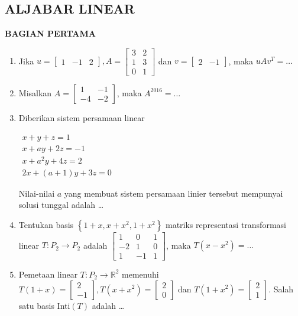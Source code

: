 \documentclass[12pt,twoside]{article}
\begin{document}
\subsection{ALJABAR LINEAR}
\textbf{BAGIAN PERTAMA}
\begin{enumerate}
	\item Jika $u = \left[ \begin{array}{ccc}
				      1 & -1 & 2
			      \end{array} \right], A = \left[ \begin{array}{cc}
				      3 & 2 \\1&3\\0&1
			      \end{array} \right]$ dan $v = \left[ \begin{array}{cc}
				      2 & -1
			      \end{array} \right]$, maka $uAv^T = \dots$

	\item Misalkan $A = \left[ \begin{array}{cc}
				      1 & -1 \\-4&-2
			      \end{array} \right]$, maka $A^{2016} = \dots$

	\item Diberikan sistem persamaan linear
	      \begin{center}
		      $\begin{array}{r}
				      x+y+z = 1   \\
				      x+ay+2z=-1  \\
				      x+a^2y+4z=2 \\
				      2x+(a+1)y+3z = 0
			      \end{array}$
	      \end{center}
	      Nilai-nilai $a$ yang membuat sistem persamaan linier tersebut mempunyai solusi tunggal adalah \dots

	\item Tentukan basis $\left\lbrace 1+x, x+x^2 , 1+x^2 \right\rbrace$ matriks representasi transformasi linear $T : P_2 \to P_2 $ adalah $\left[ \begin{array}{ccc}
				      1 & 0 & 1 \\-2&1&0\\1&-1&1
			      \end{array} \right]$, maka $T(x-x^2) =\dots$

	\item Pemetaan linear $T : P_2 \to \mathbb{R}^2$ memenuhi $T(1+x) = \left[ \begin{array}{c}
				      2 \\-1
			      \end{array} \right], T(x+x^2) = \left[ \begin{array}{c}
				      2 \\0
			      \end{array} \right]$ dan $T(1+x^2) = \left[ \begin{array}{c}
				      2 \\1
			      \end{array} \right]$. Salah satu basis Inti$(T)$ adalah \dots


\end{enumerate}
\end{document}
